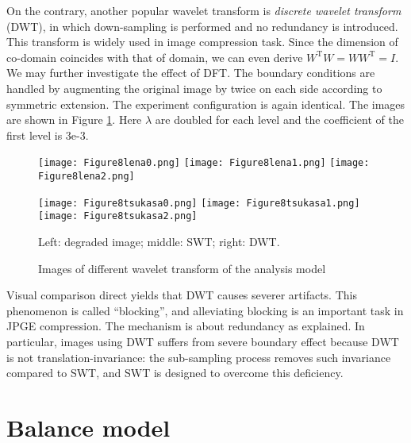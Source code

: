 \documentclass[english, nochinese]{pnote}
\begin{document}
On the contrary, another popular wavelet transform is \emph{discrete wavelet transform} (DWT), in which down-sampling is performed and no redundancy is introduced. This transform is widely used in image compression task. Since the dimension of co-domain coincides with that of domain, we can even derive $ W^{\text{T}} W = W W^{\text{T}} = I $. We may further investigate the effect of DFT. The boundary conditions are handled by augmenting the original image by twice on each side according to symmetric extension. The experiment configuration is again identical. The images are shown in Figure \ref{Fig:DWT}. Here $\lambda$ are doubled for each level and the coefficient of the first level is 3e-3.

\begin{figure}[htbp]
{
\centering

\texttt{[image: Figure8lena0.png]}
\texttt{[image: Figure8lena1.png]}
\texttt{[image: Figure8lena2.png]}

\texttt{[image: Figure8tsukasa0.png]}
\texttt{[image: Figure8tsukasa1.png]}
\texttt{[image: Figure8tsukasa2.png]}

\caption{Images of different wavelet transform of the analysis model}
\label{Fig:DWT}
}
{
\footnotesize Left: degraded image; middle: SWT; right: DWT.
}
\end{figure}

Visual comparison direct yields that DWT causes severer artifacts. This phenomenon is called ``blocking'', and alleviating blocking is an important task in JPGE compression. The mechanism is about redundancy as explained. In particular, images using DWT suffers from severe boundary effect because DWT is not translation-invariance: the sub-sampling process removes such invariance compared to SWT, and SWT is designed to overcome this deficiency.

\section{Balance model}
\end{document}
